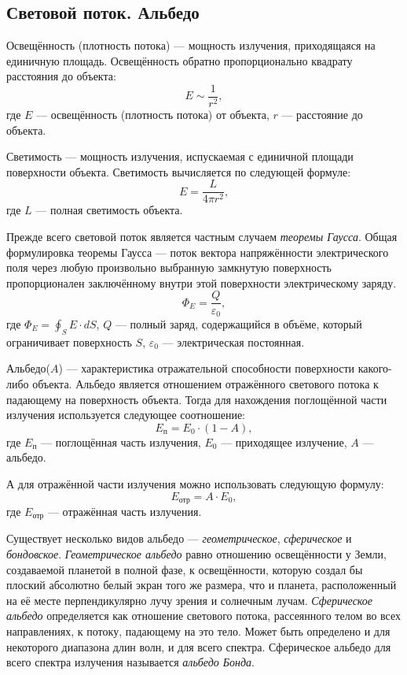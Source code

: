 \subsection{Световой поток. Альбедо}
Освещённость (плотность потока) --- мощность излучения, приходящаяся на единичную площадь. Освещённость обратно пропорционально квадрату расстояния до объекта:
\begin{equation}
E\sim \frac{1}{r^2},
\end{equation}
где $E$ --- освещённость (плотность потока) от объекта, $r$ --- расстояние до объекта.

Светимость --- мощность излучения, испускаемая с единичной площади поверхности объекта. Светимость вычисляется по следующей формуле:
\begin{equation}
E=\frac{L}{4\pi r^2},
\end{equation}
где $L$ --- полная светимость объекта.

Прежде всего световой поток является частным случаем \textit{теоремы Гаусса}. Общая формулировка теоремы Гаусса --- поток вектора напряжённости электрического поля через любую произвольно выбранную замкнутую поверхность пропорционален заключённому внутри этой поверхности электрическому заряду.
\begin{equation}
\Phi_E=\frac{Q}{\varepsilon _{0}},
\end{equation}
где $\Phi_E=\oint_SE\cdot dS$, $Q$ --- полный заряд, содержащийся в объёме, который ограничивает поверхность $S$, $\varepsilon _{0}$ --- электрическая постоянная.


Альбедо($A$) --- характеристика отражательной способности поверхности какого-либо объекта. Альбедо является отношением отражённого светового потока к падающему на поверхность объекта. Тогда для нахождения поглощённой части излучения используется следующее соотношение:
\begin{equation}
E_{\text{п}}=E_0\cdot (1-A),
\end{equation}
где $E_{\text{п}}$ --- поглощённая часть излучения, $E_0$ --- приходящее излучение, $A$ --- альбедо.

А для отражённой части излучения можно использовать следующую формулу:
\begin{equation}
E_{\text{отр}}=A\cdot E_0,
\end{equation}
где $E_{\text{отр}}$ --- отражённая часть излучения.

Существует несколько видов альбедо --- \textit{геометрическое}, \textit{сферическое} и \textit{бондовское}. \textit{Геометрическое альбедо} равно отношению освещённости у Земли, создаваемой планетой в полной фазе, к освещённости, которую создал бы плоский абсолютно белый экран того же размера, что и планета, расположенный на её месте перпендикулярно лучу зрения и солнечным лучам. \textit{Сферическое альбедо} определяется как отношение светового потока, рассеянного телом во всех направлениях, к потоку, падающему на это тело. Может быть определено и для некоторого диапазона длин волн, и для всего спектра. Сферическое альбедо для всего спектра излучения называется \textit{альбедо Бонда}.